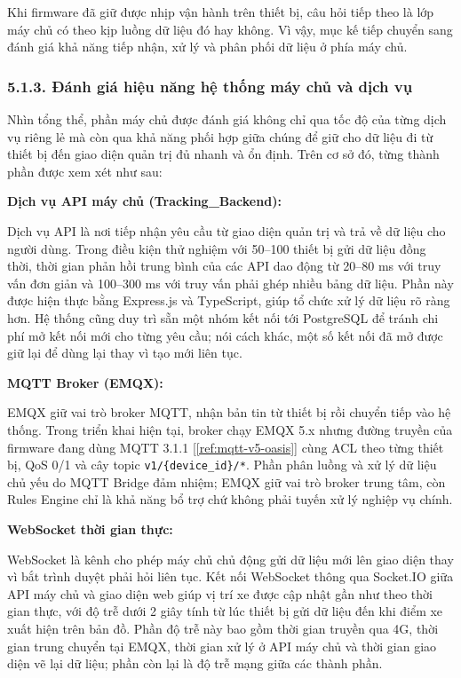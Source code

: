 \documentclass[a4paper]{extarticle}
\newcommand{\ieeecite}[1]{[\ref{#1}]}
\providecommand{\parencite}[1]{\ieeecite{#1}}
\begin{document}
Khi firmware đã giữ được nhịp vận hành trên thiết bị, câu hỏi tiếp theo
là lớp máy chủ có theo kịp luồng dữ liệu đó hay không. Vì vậy, mục kế
tiếp chuyển sang đánh giá khả năng tiếp nhận, xử lý và phân phối dữ liệu
ở phía máy chủ.


\subsubsection{5.1.3. Đánh giá hiệu năng hệ thống máy chủ
và dịch vụ}\label{513-ux111uxe1nh-giuxe1-hiux1ec7u-nux103ng-hux1ec7-thux1ed1ng-ux111uxe1m-muxe2y-cloud}

Nhìn tổng thể, phần máy chủ được đánh giá không chỉ qua tốc độ của từng
dịch vụ riêng lẻ mà còn qua khả năng phối hợp giữa chúng để giữ cho dữ
liệu đi từ thiết bị đến giao diện quản trị đủ nhanh và ổn định. Trên cơ sở đó,
từng thành phần được xem xét như sau:

\textbf{Dịch vụ API máy chủ (Tracking\_Backend):}

Dịch vụ API là nơi tiếp nhận yêu cầu từ giao diện quản trị và trả về dữ
liệu cho người dùng. Trong điều kiện thử nghiệm với 50--100 thiết bị gửi
dữ liệu đồng thời, thời gian phản hồi trung bình của các API dao động từ
20--80 ms với truy vấn đơn giản và 100--300 ms với truy vấn phải ghép
nhiều bảng dữ liệu. Phần này được hiện thực bằng Express.js và
TypeScript, giúp tổ chức xử lý dữ liệu rõ ràng hơn. Hệ thống cũng duy
trì sẵn một nhóm kết nối tới PostgreSQL để tránh chi phí mở kết nối mới
cho từng yêu cầu; nói cách khác, một số kết nối đã mở được giữ lại để
dùng lại thay vì tạo mới liên tục.

\textbf{MQTT Broker (EMQX):}

EMQX giữ vai trò broker MQTT, nhận bản tin từ thiết bị rồi chuyển tiếp
vào hệ thống. Trong triển khai hiện tại, broker chạy EMQX 5.x nhưng
đường truyền của firmware đang dùng MQTT 3.1.1
\parencite{ref:mqtt-v5-oasis} cùng ACL theo từng thiết bị, QoS 0/1 và
cây topic \texttt{v1/\{device\_id\}/*}. Phần phân luồng và xử lý dữ liệu
chủ yếu do MQTT Bridge đảm nhiệm; EMQX giữ vai trò broker trung tâm, còn
Rules Engine chỉ là khả năng bổ trợ chứ không phải tuyến xử lý nghiệp vụ
chính.

\textbf{WebSocket thời gian thực:}

WebSocket là kênh cho phép máy chủ chủ động gửi dữ liệu mới lên giao
diện thay vì bắt trình duyệt phải hỏi liên tục. Kết nối WebSocket thông
qua Socket.IO giữa API máy chủ và giao diện web giúp vị trí xe được cập nhật gần
như theo thời gian thực, với độ trễ dưới 2 giây tính từ lúc thiết bị gửi
dữ liệu đến khi điểm xe xuất hiện trên bản đồ. Phần độ trễ này bao gồm
thời gian truyền qua 4G, thời gian trung chuyển tại EMQX, thời gian xử
lý ở API máy chủ và thời gian giao diện vẽ lại dữ liệu; phần còn lại là độ
trễ mạng giữa các thành phần.
\end{document}
